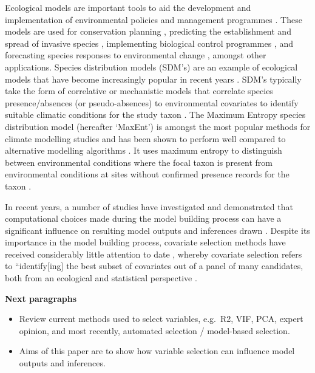 \documentclass[
  authoryear,
  preprint,
  3p,
  twocolumn]{elsarticle}
\begin{document}
Ecological models are important tools to aid the development and
implementation of environmental policies and management programmes
\citep{Addison2013, Schuwirth2019, Sutton2022}. These models are used
for conservation planning \citep{Guisan2013}, predicting the
establishment and spread of invasive species \citep{Martin2020},
implementing biological control programmes
\citep{Sutton2019b, Mukherjee2021}, and forecasting species responses to
environmental change \citep{Bocedi2014}, amongst other applications.
Species distribution models (SDM's) are an example of ecological models
that have become increasingly popular in recent years \citep{Elith2009}.
SDM's typically take the form of correlative or mechanistic models that
correlate species presence/absences (or pseudo-absences) to
environmental covariates to identify suitable climatic conditions for
the study taxon \citep{Elith2011}. The Maximum Entropy species
distribution model (hereafter `MaxEnt') is amongst the most popular
methods for climate modelling studies and has been shown to perform well
compared to alternative modelling algorithms
\citep{Wisz2008, Phillips2017}. It uses maximum entropy to distinguish
between environmental conditions where the focal taxon is present from
environmental conditions at sites without confirmed presence records for
the taxon \citep{Elith2011}.

In recent years, a number of studies have investigated and demonstrated
that computational choices made during the model building process can
have a significant influence on resulting model outputs and inferences
drawn
\citep{Warren2011, Webber2011, Shcheglovitova2013, Boria2017, Sutton2022}.
Despite its importance in the model building process, covariate
selection methods have received considerably little attention to date
\citep[but see][]{Austin2011, Fourcade2018, Adde2023}, whereby covariate
selection refers to ``identify{[}ing{]} the best subset of covariates
out of a panel of many candidates, both from an ecological and
statistical perspective \citep[see][ and references therein]{Adde2023}.

\textbf{Next paragraphs}

\begin{itemize}
\item
  Review current methods used to select variables, e.g.~R2, VIF, PCA,
  expert opinion, and most recently, automated selection / model-based
  selection.
\item
  Aims of this paper are to show how variable selection can influence
  model outputs and inferences.
\end{itemize}
\end{document}
